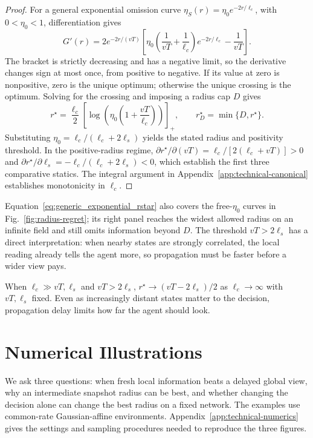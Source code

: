 \documentclass[11pt]{article}
\begin{document}
\begin{proof}
For a general exponential omission curve $\eta_S(r)=\eta_0e^{-2r/\ell_c}$,
with $0<\eta_0<1$, differentiation gives
\[
G'(r)=2e^{-2r/(vT)}\left[
\eta_0\left(\frac{1}{vT}+\frac{1}{\ell_c}\right)e^{-2r/\ell_c}
-\frac{1}{vT}\right].
\]
The bracket is strictly decreasing and has a negative limit, so the
derivative changes sign at most once, from positive to negative.
If its value at zero is nonpositive, zero is the unique optimum;
otherwise the unique crossing is the optimum. Solving for the crossing
and imposing a radius cap $D$ gives
\begin{equation}
r^\star=\frac{\ell_c}{2}
\left[\log\!\left(\eta_0\left(1+\frac{vT}{\ell_c}\right)\right)\right]_+,
\qquad r_D^\star=\min\{D,r^\star\}.
\label{eq:generic_exponential_rstar}
\end{equation}
Substituting $\eta_0=\ell_c/(\ell_c+2\ell_s)$ yields the stated radius
and positivity threshold. In the positive-radius regime,
$\partial r^\star/\partial(vT)=\ell_c/[2(\ell_c+vT)]>0$ and
$\partial r^\star/\partial\ell_s=-\ell_c/(\ell_c+2\ell_s)<0$,
which establish the first three comparative statics.
The integral argument in Appendix~\ref{app:technical-canonical} establishes
monotonicity in $\ell_c$.
\end{proof}

Equation~\eqref{eq:generic_exponential_rstar} also covers the free-$\eta_0$
curves in Fig.~\ref{fig:radius-regret}; its right panel reaches the widest
allowed radius on an infinite field and still omits information beyond $D$.
The threshold $vT>2\ell_s$ has a direct interpretation: when nearby states
are strongly correlated, the local reading already tells the agent more,
so propagation must be faster before a wider view pays.

When $\ell_c\gg vT,\ell_s$ and $vT>2\ell_s$,
$r^\star\to(vT-2\ell_s)/2$ as $\ell_c\to\infty$ with $vT,\ell_s$ fixed.
Even as increasingly distant states matter to the decision, propagation
delay limits how far the agent should look.

\section{Numerical Illustrations}
\label{sec:numerical-evaluation}

We ask three questions: when fresh local information beats a delayed global
view, why an intermediate snapshot radius can be best, and whether changing
the decision alone can change the best radius on a fixed network. The
examples use common-rate Gaussian-affine environments.
Appendix~\ref{app:technical-numerics} gives the settings and sampling
procedures needed to reproduce the three figures.
\end{document}
